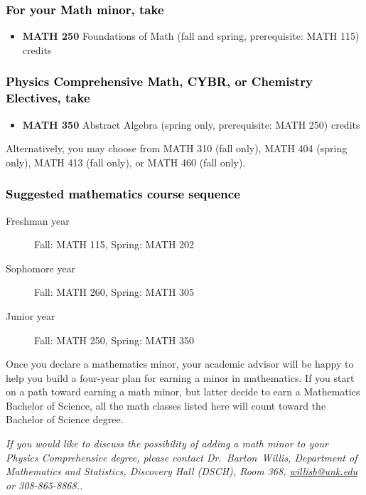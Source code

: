 \documentclass[10pt]{article}
\makeatletter
\newenvironment{mypar}[2]
   {\begin{list}{}%
     {\setlength\leftmargin{#1}
     \setlength\rightmargin{#2}}
     \item[]}
   {\end{list}}
\newcommand{\foundations}{\textbf{MATH 250} Foundations of Math (fall and spring, prerequisite: MATH 115)  \dotfill 3 credits}
\newcommand{\abstractalgebra}{\textbf{MATH 350}	Abstract Algebra (spring only, prerequisite: MATH 250) \dotfill 	3 credits}
\newcommand{\contactbw}{\mbox{Dr.\ Barton Willis}, Department of Mathematics and Statistics,  Discovery Hall (DSCH), Room 368,
\href{mailto:willisb@unk.edu}{willisb@unk.edu} or 308-865-8868.}
\makeatother
\begin{document}
\subsubsection*{\textcolor{black}{For your Math minor, take}}
\begin{itemize}
\item \foundations
\end{itemize}

\subsubsection*{\textcolor{black}{Physics Comprehensive Math, CYBR, or Chemistry Electives, take}}
\begin{itemize}
\item \abstractalgebra
\end{itemize}
\begin{mypar}{0.5cm}{0.5cm} Alternatively, you may choose from MATH 310 (fall only), MATH 404 (spring only), MATH 413 (fall only), or MATH 460 (fall only).  \end{mypar}

\subsubsection*{\textcolor{black}{Suggested mathematics course sequence}}

\begin{description}
   \item[\phantom{xxx} Freshman year] Fall: MATH 115, Spring:  MATH 202
      \item[\phantom{xxx} Sophomore year]  Fall: MATH 260,  Spring: MATH 305
     \item[\phantom{xxx} Junior year]  Fall: MATH 250,  Spring: MATH 350
 \end{description}
  \vspace{0.1in}

 \noindent Once you declare a mathematics minor, your academic advisor will be happy to help you build a four-year plan for earning a minor in mathematics.  If you start on a path toward earning a math minor, but latter decide to earn a  Mathematics Bachelor of Science, all the math classes listed here will count toward the Bachelor of Science degree.

   \vspace{0.1in}

\noindent \textcolor{unkblue}{\emph{If you would like to discuss the possibility of  adding a math minor to your Physics Comprehensive degree, please contact \contactbw.}}
\end{document}
